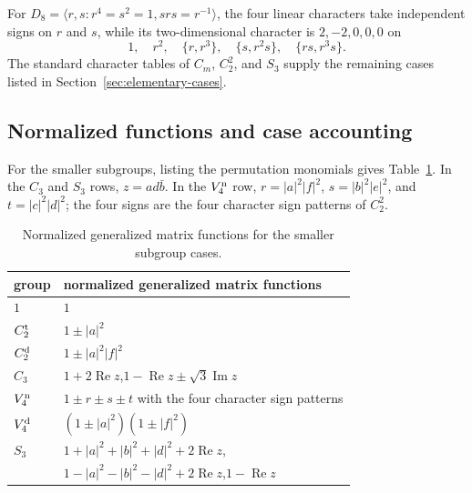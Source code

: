 \documentclass[10pt,twoside]{siamart1116}
\newcommand{\Rea}{\operatorname{Re}}
\newcommand{\Ima}{\operatorname{Im}}
\begin{document}
For $D_8=\langle r,s:r^4=s^2=1,srs=r^{-1}\rangle$, the four linear
characters take independent signs on $r$ and $s$, while its two-dimensional
character is $2,-2,0,0,0$ on
\[
 1,\quad r^2,\quad\{r,r^3\},\quad\{s,r^2s\},\quad\{rs,r^3s\}.
\]
The standard character tables of $C_m$, $C_2^2$, and $S_3$ supply the
remaining cases listed in Section~\ref{sec:elementary-cases}.

\subsection{Normalized functions and case accounting}

For the smaller subgroups, listing the permutation monomials gives
Table~\ref{tab:elementary-character-expansions}.  In the $C_3$ and $S_3$
rows, $z=ad\bar b$.  In the $V_4^{\rm n}$ row,
$r=|a|^2|f|^2$, $s=|b|^2|e|^2$, and $t=|c|^2|d|^2$; the four signs are
the four character sign patterns of $C_2^2$.

\begin{table}[htbp]
\caption{Normalized generalized matrix functions for the smaller subgroup cases.}
\label{tab:elementary-character-expansions}
\centering
\small
\begin{tabularx}{\textwidth}{@{}l>{\raggedright\arraybackslash}X@{}}
\toprule
group & normalized generalized matrix functions\\
\midrule
$1$ & $1$\\
$C_2^{\rm t}$ & $1\pm|a|^2$\\
$C_2^{\rm d}$ & $1\pm|a|^2|f|^2$\\
$C_3$ & $1+2\Rea z$,\quad $1-\Rea z\pm\sqrt3\Ima z$\\
$V_4^{\rm n}$ & $1\pm r\pm s\pm t$ with the four character sign patterns\\
$V_4^{\rm d}$ & $(1\pm|a|^2)(1\pm|f|^2)$\\
$S_3$ & $1+|a|^2+|b|^2+|d|^2+2\Rea z$,\\
& $1-|a|^2-|b|^2-|d|^2+2\Rea z$,\quad $1-\Rea z$\\
\bottomrule
\end{tabularx}
\end{table}
\end{document}
